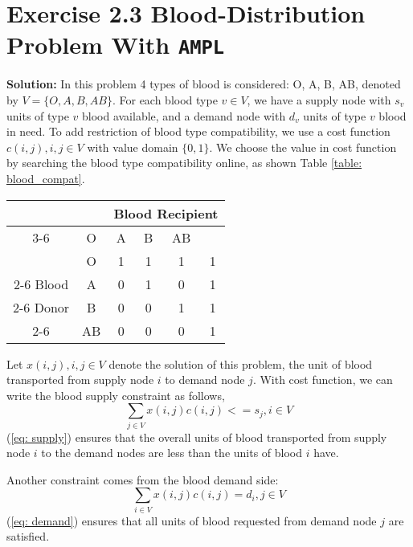 \section{Exercise 2.3 Blood-Distribution Problem With {\tt AMPL}}
\textbf{Solution:}
In this problem 4 types of blood is considered: O, A, B, AB, denoted by $V=\{O, A, B, AB\}$. For each blood type $v\in V$, we have a supply node with $s_v$ units of type $v$ blood available, and a demand node with $d_v$ units of type $v$ blood in need. To add restriction of blood type compatibility, we use a cost function $c(i,j), i,j\in V$ with value domain $\{0,1\}$. We choose the value in cost function by searching the blood type compatibility online, as shown Table \ref{table: blood_compat}.

\begin{table*}[!h]
\centering
\small
\begin{tabular}{|c|c|c|c|c|c|}
\hline
\multicolumn{2}{|c|}{} &\multicolumn{4}{|c|}{Blood Recipient}\\
\cline{3-6}
\multicolumn{2}{|c|}{} & O & A & B & AB \\
\hline
& O & 1 & 1 & 1 & 1\\
\cline{2-6}
Blood& A & 0 & 1 & 0 & 1\\
\cline{2-6}
Donor& B & 0 & 0 & 1 & 1\\
\cline{2-6}
& AB & 0 & 0 & 0 & 1\\
\hline
\end{tabular}
\caption{Cost function values setting using real blood type compatibility}
\label{table: blood_compat}
\end{table*}

Let $x(i,j), i,j\in V$ denote the solution of this problem, the unit of blood transported from supply node $i$ to demand node $j$. With cost function, we can write the blood supply constraint as follows,
\begin{equation}
\label{eq: supply}
   \sum_{j\in V} x(i,j)c(i,j)<= s_j, i\in V
\end{equation}
(\ref{eq: supply}) ensures that the overall units of blood transported from supply node $i$ to the demand nodes are less than the units of blood $i$ have.

Another constraint comes from the blood demand side:\begin{equation}
\label{eq: demand}
   \sum_{i\in V} x(i,j)c(i,j) = d_i, j\in V
\end{equation}
(\ref{eq: demand}) ensures that all units of blood requested from demand node $j$ are satisfied.

